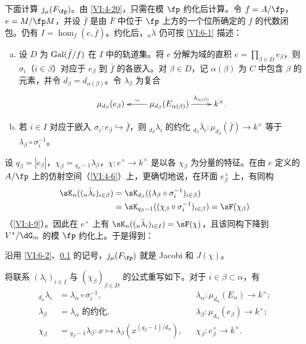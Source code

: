 \subsection{}\label{VI:6-3}
下面计算 $j_\mu(F_\fp)$。由 \ref{VI:4-20}，只需在模 $\fp$ 约化后计算。令 $f=A/\fp$，$e=M/\fp M$，并设 $\bar f$ 是由 $\bar F$ 中位于 $\fp$ 上方的一个位所确定的 $f$ 的代数闭包。仍有 $I=\hom_f(e,\bar f)$。约化后，${}_n\lambda$ 仍可按 \ref{VI:6-1} 描述：
\begin{enumerate}[a)]
\item 设 $D$ 为 $\operatorname{Gal}(\bar f/f)$ 在 $I$ 中的轨道集。将 $e$ 分解为域的直积 $e=\prod_{\beta\in D}e_\beta$，则 $\sigma_i$（$i\in\beta$）对应于 $e_\beta$ 到 $\bar f$ 的各嵌入。对 $\beta\in D$，记 $\alpha(\beta)$ 为 $C$ 中包含 $\beta$ 的元素，并令 $d_\beta=d_{\alpha(\beta)}$。令 $\lambda_\beta$ 为复合
\[\xymatrix{
\mu_{d_\beta}(e_\beta)&\mu_{d_\beta}(E_{\alpha(\beta)})\ar[l]_-\sim\ar[r]^-{\lambda_{\alpha(\beta)}}&k^\times.
}\]
\item 若 $i\in I$ 对应于嵌入 $\sigma_i:e_\beta\hookrightarrow\bar f$，则 ${}_{d_\beta}\lambda_i$ 的约化
${}_{d_\beta}\bar\lambda_i:\mu_{d_\beta}(\bar f)\to k^\times$
等于 $\lambda_\beta\circ\sigma_i^{-1}$。
\end{enumerate}
设 $q_\beta=|e_\beta|$，$\chi_\beta={}_{q_\beta-1}\lambda_\beta$，$\chi:e^\times\to k^\times$ 是以各 $\chi_\beta$ 为分量的特征。在由 $e$ 定义的 $A/\fp$ 上的仿射空间（\ref{VI:4-6}）上，更确切地说，在环面 $e_\beta^\times$ 上，有同构
\begin{align*}
\sK_n(({}_n\bar\lambda_i)_{i\in\beta})
&=\sK_{d_\beta}((\lambda_\beta\circ\sigma_i^{-1})_{i\in\beta})\\
&=\sK_{q_\beta-1}((\chi_\beta\circ\sigma_i^{-1})_{i\in\beta})
=\sF(\chi_\beta)
\end{align*}
（\ref{VI:4-9}）。因此在 $e^\times$ 上有
$\sK_n(({}_n\bar\lambda_i)_{i\in I})=\sF(\chi)$，且该同构下降到 $V^\ast/\dG_m$ 的模 $\fp$ 约化上。于是得到：

\begin{proposition_}\label{VI:6-4}
沿用 \ref{VI:6-2}、\ref{VI:6-3} 的记号，$j_\mu(F_\fp)$ 就是 Jacobi 和 $J(\chi)$。
\end{proposition_}
将联系 $(\lambda_i)_{i\in I}$ 与 $(\chi_\beta)_{\beta\in D}$ 的公式重写如下。对于 $i\in\beta\subset\alpha$，有
\begin{align*}
{}_{d_\alpha}\lambda_i&=\lambda_\alpha\circ\sigma_i^{-1},
&&\lambda_\alpha:\mu_{d_\alpha}(E_\alpha)\to k^\times;\\
\lambda_\beta&=\lambda_\alpha\text{ 的约化},
&&\lambda_\beta:\mu_{d_\alpha}(e_\beta)\to k^\times;\\
\chi_\beta&={}_{q_\beta-1}\lambda_\beta:
 x\mapsto\lambda_\beta(x^{(q_\beta-1)/d_\alpha}),
&&\chi_\beta:e_\beta^\times\to k^\times.
\end{align*}

